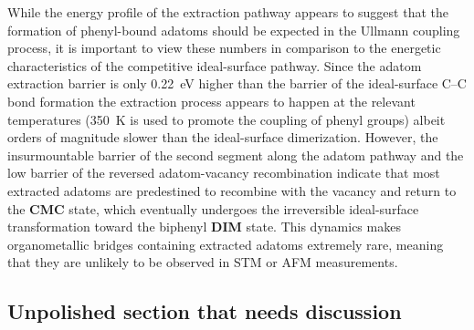 \documentclass[%
 reprint,
 amsmath,amssymb,
 aps,
prb,
floatfix,
]{revtex4-2}
\newcommand{\lock}{\color{red}}
\newcommand{\lock}{\color{black}}
\begin{document}
{\lock
While the energy profile of the extraction pathway appears to suggest that the formation of phenyl-bound adatoms should be expected in the Ullmann coupling process, it is important to view these numbers in comparison to the energetic characteristics of the competitive ideal-surface pathway. Since the adatom extraction barrier is only \SI{0.22}{\electronvolt} higher than the barrier of the ideal-surface C--C bond formation the extraction process appears to happen at the relevant temperatures (\SI{350}{\kelvin} is used to promote the coupling of phenyl groups) albeit orders of magnitude slower than the ideal-surface dimerization. However, the insurmountable barrier of the second segment along the adatom pathway and the low barrier of the reversed adatom-vacancy recombination  indicate that most extracted adatoms are predestined to recombine with the vacancy and return to the \textbf{CMC} state, which eventually undergoes the irreversible ideal-surface transformation toward the biphenyl \textbf{DIM} state. This dynamics makes organometallic bridges containing extracted adatoms extremely rare, meaning that they are unlikely to be observed in STM or AFM measurements.

}

\ifdefined\INTERNAL
\subsection{Unpolished section that needs discussion}
\end{document}
